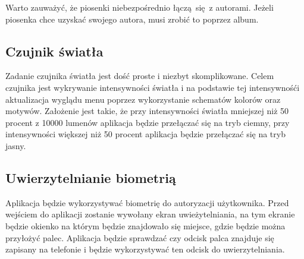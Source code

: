 Warto zauważyć, że piosenki niebezpośrednio łączą się z autorami. Jeżeli piosenka chce uzyskać swojego autora, musi zrobić to poprzez album.

\subsection{Czujnik światła}

Zadanie czujnika światła jest dość proste i niezbyt skomplikowane.
Celem czujnika jest wykrywanie intensywności światła i na podstawie tej intensywnośći aktualizacja wyglądu menu poprzez wykorzystanie schematów kolorów oraz motywów. Założenie jest takie, że przy intensywności światła mniejszej niż 50 procent z 10000 lumenów aplikacja będzie przełączać się na tryb ciemny, przy intensywności większej niż 50 procent aplikacja będzie przełączać się na tryb jasny.

\subsection{Uwierzytelnianie biometrią}
Aplikacja będzie wykorzystywać biometrię do autoryzacji użytkownika.
Przed wejściem do aplikacji zostanie wywołany ekran uwieżytelniania, na tym ekranie będzie okienko na którym będzie znajdowało się miejsce, gdzie będzie można przyłożyć palec. Aplikacja będzie sprawdzać czy odcisk palca znajduje się zapisany na telefonie i będzie wykorzystywać ten odcisk do uwierzytelniania.
